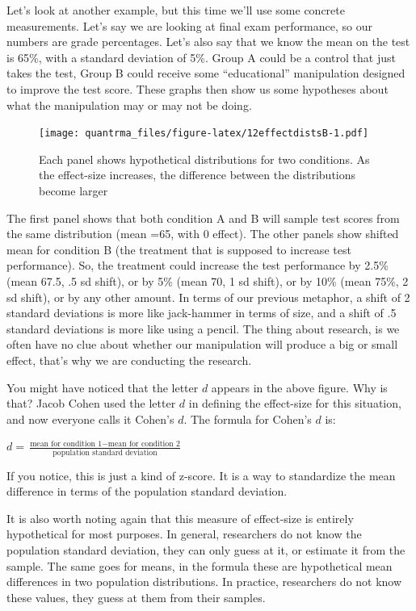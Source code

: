 \documentclass[
]{book}
\begin{document}
Let's look at another example, but this time we'll use some concrete measurements. Let's say we are looking at final exam performance, so our numbers are grade percentages. Let's also say that we know the mean on the test is 65\%, with a standard deviation of 5\%. Group A could be a control that just takes the test, Group B could receive some ``educational'' manipulation designed to improve the test score. These graphs then show us some hypotheses about what the manipulation may or may not be doing.

\begin{figure}
\centering
\texttt{[image: quantrma\_files/figure-latex/12effectdistsB-1.pdf]}
\caption{\label{fig:12effectdistsB}Each panel shows hypothetical distributions for two conditions. As the effect-size increases, the difference between the distributions become larger}
\end{figure}

The first panel shows that both condition A and B will sample test scores from the same distribution (mean =65, with 0 effect). The other panels show shifted mean for condition B (the treatment that is supposed to increase test performance). So, the treatment could increase the test performance by 2.5\% (mean 67.5, .5 sd shift), or by 5\% (mean 70, 1 sd shift), or by 10\% (mean 75\%, 2 sd shift), or by any other amount. In terms of our previous metaphor, a shift of 2 standard deviations is more like jack-hammer in terms of size, and a shift of .5 standard deviations is more like using a pencil. The thing about research, is we often have no clue about whether our manipulation will produce a big or small effect, that's why we are conducting the research.

You might have noticed that the letter \(d\) appears in the above figure. Why is that? Jacob Cohen \citep{cohen1988} used the letter \(d\) in defining the effect-size for this situation, and now everyone calls it Cohen's \(d\). The formula for Cohen's \(d\) is:

\(d = \frac{\text{mean for condition 1} - \text{mean for condition 2}}{\text{population standard deviation}}\)

If you notice, this is just a kind of z-score. It is a way to standardize the mean difference in terms of the population standard deviation.

It is also worth noting again that this measure of effect-size is entirely hypothetical for most purposes. In general, researchers do not know the population standard deviation, they can only guess at it, or estimate it from the sample. The same goes for means, in the formula these are hypothetical mean differences in two population distributions. In practice, researchers do not know these values, they guess at them from their samples.
\end{document}

